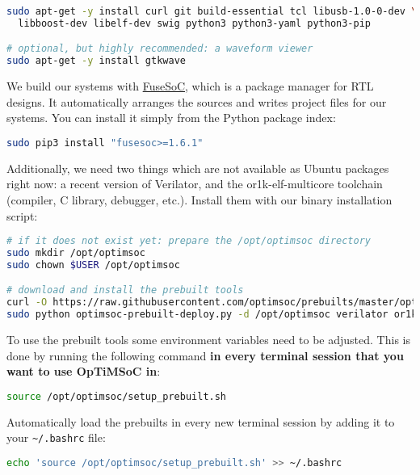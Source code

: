 \begin{lstlisting}[language=sh]
sudo apt-get -y install curl git build-essential tcl libusb-1.0-0-dev \
  libboost-dev libelf-dev swig python3 python3-yaml python3-pip

# optional, but highly recommended: a waveform viewer
sudo apt-get -y install gtkwave
\end{lstlisting}

We build our systems with
\href{https://github.com/olofk/fusesoc}{FuseSoC}, which is a package
manager for RTL designs. It automatically arranges the sources and
writes project files for our systems. You can install it simply from
the Python package index:

\begin{lstlisting}[language=sh]
sudo pip3 install "fusesoc>=1.6.1"
\end{lstlisting}

Additionally, we need two things which are not available as Ubuntu packages right now: a recent version of Verilator, and the or1k-elf-multicore toolchain (compiler, C library, debugger, etc.).
Install them with our binary installation script:

\begin{lstlisting}[language=sh]
# if it does not exist yet: prepare the /opt/optimsoc directory
sudo mkdir /opt/optimsoc
sudo chown $USER /opt/optimsoc

# download and install the prebuilt tools
curl -O https://raw.githubusercontent.com/optimsoc/prebuilts/master/optimsoc-prebuilt-deploy.py
sudo python optimsoc-prebuilt-deploy.py -d /opt/optimsoc verilator or1kelf
\end{lstlisting}

To use the prebuilt tools some environment variables need to be adjusted.
This is done by running the following command \textbf{in every terminal session that you want to use OpTiMSoC in}:

\begin{lstlisting}[language=sh]
source /opt/optimsoc/setup_prebuilt.sh
\end{lstlisting}

\begin{docnote}
Automatically load the prebuilts in every new terminal session by adding it to your \verb|~/.bashrc| file:

\begin{lstlisting}[language=sh]
echo 'source /opt/optimsoc/setup_prebuilt.sh' >> ~/.bashrc
\end{lstlisting}
\end{docnote}


